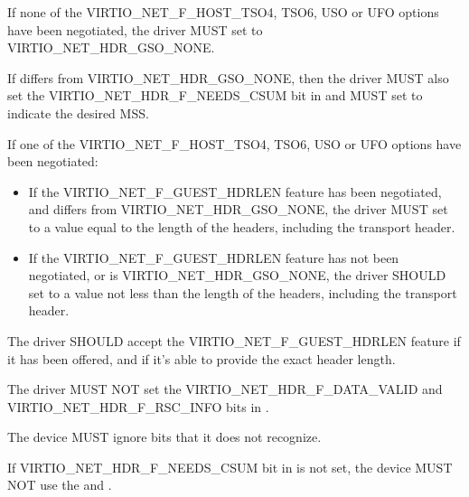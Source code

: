 If none of the VIRTIO_NET_F_HOST_TSO4, TSO6, USO or UFO options have
been negotiated, the driver MUST set  to
VIRTIO_NET_HDR_GSO_NONE.

If  differs from VIRTIO_NET_HDR_GSO_NONE, then
the driver MUST also set the VIRTIO_NET_HDR_F_NEEDS_CSUM bit in
 and MUST set  to indicate the
desired MSS.

If one of the VIRTIO_NET_F_HOST_TSO4, TSO6, USO or UFO options have
been negotiated:
\begin{itemize}
\item If the VIRTIO_NET_F_GUEST_HDRLEN feature has been negotiated,
	and  differs from VIRTIO_NET_HDR_GSO_NONE,
	the driver MUST set  to a value equal to the length
	of the headers, including the transport header.

\item If the VIRTIO_NET_F_GUEST_HDRLEN feature has not been negotiated,
	or  is VIRTIO_NET_HDR_GSO_NONE,
	the driver SHOULD set  to a value
	not less than the length of the headers, including the transport
	header.
\end{itemize}

The driver SHOULD accept the VIRTIO_NET_F_GUEST_HDRLEN feature if it has
been offered, and if it's able to provide the exact header length.

The driver MUST NOT set the VIRTIO_NET_HDR_F_DATA_VALID and
VIRTIO_NET_HDR_F_RSC_INFO bits in .

The device MUST ignore  bits that it does not recognize.

If VIRTIO_NET_HDR_F_NEEDS_CSUM bit in  is not set, the
device MUST NOT use the  and .

